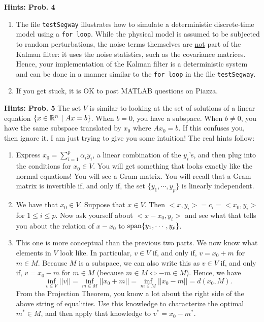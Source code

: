 \documentclass[letterpaper]{article}
\begin{document}
\noindent \textbf{Hints: Prob. 4 }
 \begin{enumerate}
\setlength{\itemsep}{.1in}
\renewcommand{\labelenumi}{(\alph{enumi})}

  \item The file \texttt{testSegway} illustrates how to simulate a deterministic discrete-time model using a \texttt{for loop}. While the physical model is assumed to be subjected to random perturbations, the noise terms themselves are \underline{not} part of the Kalman filter: it uses the noise statistics, such as the covariance matrices. Hence, your implementation of the Kalman filter is a deterministic system and can be done in a manner similar to the \texttt{for loop} in the file \texttt{testSegway}.

\item If you get stuck, it is OK to post MATLAB questions on Piazza.

\end{enumerate}


\vspace{1cm}


\noindent \textbf{Hints: Prob. 5 }  The set $V$ is similar to looking at the set of solutions of a linear equation $\{x \in \mathbb R^n~|~ Ax = b \}$. When $b=0$, you have a subspace. When $b\not = 0$, you have the same subspace translated by $x_0$ where $A x_0 = b$.  If this confuses you, then ignore it. I am just trying to give you some intuition! The real hints follow:

 \begin{enumerate}
\setlength{\itemsep}{.1in}
\renewcommand{\labelenumi}{(\alph{enumi})}

  \item Express $x_0=\sum_{i=1}^{p} \alpha_i y_i$, a linear combination of the $y_i$'s, and then plug into the conditions for $x_0 \in V$. You will get something that looks exactly like the normal equations! You will see a Gram matrix. You will recall that a Gram matrix is invertible if, and only if, the set  $\{y_1, \cdots, y_p \}$ is linearly independent.

  \item We have that $x_0\in V$. Suppose that $x\in V$. Then $<x,y_i>=c_i = <x_0,y_i>$ for $1 \le i \le p$. Now ask yourself about $<x-x_0, y_i>$ and see what that tells you about the relation of $x-x_0$ to $\textrm{span} \{ y_1, \cdots, y_p \}$.

      \item This one is more conceptual than the previous two parts. We now know what elements in $V$ look like. In particular, $v\in V$ if, and only if, $v=x_0 +m$ for $m\in M$. Because $M$ is a subspace, we can also write this as  $v\in V$ if, and only if, $v=x_0 - m$ for $m\in M$ (because $m\in M \Leftrightarrow -m \in M$). Hence, we have
          $$\inf_{v\in V} ||v|| = \inf_{m\in M}||x_0+m|| = \inf_{m\in M} ||x_0-m||=d(x_0,M). $$
          From the Projection Theorem, you know a lot about the right side of the above string of equalities. Use this knowledge to characterize the optimal $m^*\in M$, and then apply that knowledge to $v^*=x_0-m^*$.

\end{enumerate}
\end{document}
